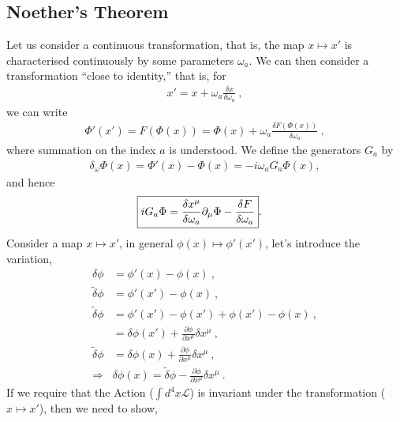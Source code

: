 \documentclass[12pt,a4paper]{report}
\begin{document}
\subsection{Noether’s Theorem}
Let us consider a continuous transformation, that is, the map $x\longmapsto x'$ is characterised continuously by some parameters $\omega_a$. We can then consider a transformation “close to identity,” that is, for \cite{Antonin}
\begin{align}
    x'=x+\omega_a\frac{\delta x}{\delta \omega_a}\label{1.17}~,
\end{align}
we can write
\begin{align}
    \Phi'(x')=F(\Phi(x))=\Phi(x)+\omega_a\frac{\delta F(\Phi(x))}{\delta\omega_a}~,
\end{align}
where summation on the index $a$ is understood. We define the generators $G_a$ by
\begin{align}
    \delta_\omega \Phi(x)=\Phi'(x)-\Phi(x)=-i\omega_a G_a \Phi(x),
\end{align}
and hence
\begin{align}
    \Aboxed{iG_a \Phi=\frac{\delta x^\mu}{\delta\omega_a}\partial_\mu\Phi-\frac{\delta F}{\delta\omega_a}}.\label{1.20}
\end{align}
Consider a map $x\longmapsto x'$, in general $\phi(x)\longmapsto\phi'(x')$,
let's introduce the variation,\cite{Peskin, Tripathy}
\begin{align}
    \delta\phi&=\phi'(x)-\phi(x)~,\\
    \tilde{\delta}\phi&=\phi'(x')-\phi(x)~,\nonumber\\
      \tilde{\delta}\phi&=\phi'(x')-\phi(x')+\phi(x')-\phi(x)~,\nonumber\\
      &=\delta\phi(x')+\frac{\partial\phi}{\partial x^\mu}\delta x^\mu~,\nonumber\\
      \tilde{\delta}\phi&=\delta\phi(x)+\frac{\partial\phi}{\partial x^\mu}\delta x^\mu~,\nonumber\\
      \Longrightarrow&\delta\phi(x)=\tilde{\delta}\phi-\frac{\partial\phi}{\partial x^\mu}\delta x^\mu~.
\end{align}
If we require that the Action ($\int d^4x \mathcal{L}$) is invariant under the transformation ($x\longmapsto x'$), then we need to show,
\end{document}
